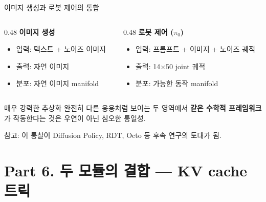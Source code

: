 \documentclass[aspectratio=169,10pt]{beamer}
\begin{document}
\begin{frame}{이미지 생성과 로봇 제어의 통합}
\begin{columns}[T]
\begin{column}{0.48\textwidth}
\textbf{이미지 생성}
\begin{itemize}
  \item 입력: 텍스트 + 노이즈 이미지
  \item 출력: 자연 이미지
  \item 분포: 자연 이미지 manifold
\end{itemize}
\vspace{0.3em}
\centering\footnotesize{}
\end{column}
\begin{column}{0.48\textwidth}
\textbf{로봇 제어 ($\pi_0$)}
\begin{itemize}
  \item 입력: 프롬프트 + 이미지 + 노이즈 궤적
  \item 출력: 14$\times$50 joint 궤적
  \item 분포: 가능한 동작 manifold
\end{itemize}
\vspace{0.3em}
\centering\footnotesize{}
\end{column}
\end{columns}

\vspace{0.8em}
\begin{alertblock}{매우 강력한 추상화}
완전히 다른 응용처럼 보이는 두 영역에서 \textbf{같은 수학적 프레임워크}가 작동한다는 것은 우연이 아닌 \alert{심오한 통일성}.
\end{alertblock}

\vspace{0.4em}
\footnotesize
참고: 이 통찰이 Diffusion Policy, RDT, Octo 등 후속 연구의 토대가 됨.
\end{frame}

\section{Part 6. 두 모듈의 결합 --- KV cache 트릭}
\end{document}
